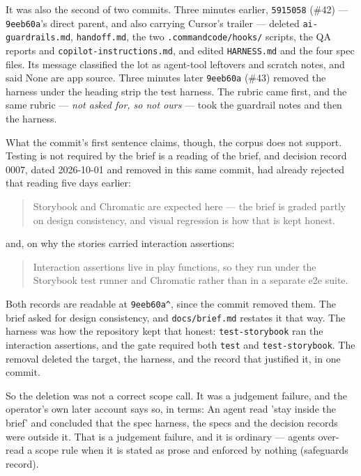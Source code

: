 \documentclass[11pt,a4paper]{article}
\begin{document}
It was also the second of two commits. Three minutes earlier, \texttt{5915058} (\#42) --- \texttt{9eeb60a}'s direct parent, and also carrying Cursor's trailer --- deleted \texttt{ai-guardrails.md}, \texttt{handoff.md}, the two \texttt{.commandcode/hooks/} scripts, the QA reports and \texttt{copilot-instructions.md}, and edited \texttt{HARNESS.md} and the four spec files. Its message classified the lot as \textquotedbl{}agent-tool leftovers and scratch notes\textquotedbl{}, and said \textquotedbl{}None are app source\textquotedbl{}. Three minutes later \texttt{9eeb60a} (\#43) removed the harness under the heading \textquotedbl{}strip the test harness\textquotedbl{}. The rubric came first, and the same rubric --- \emph{not asked for, so not ours} --- took the guardrail notes and then the harness.

What the commit's first sentence claims, though, the corpus does not support. \textquotedbl{}Testing is not required by the brief\textquotedbl{} is a reading of the brief, and decision record 0007, dated 2026-10-01 and removed in this same commit, had already rejected that reading five days earlier:

\begin{quote}
Storybook and Chromatic are expected here --- the brief is graded partly on design consistency, and visual regression is how that is kept honest.
\end{quote}

and, on why the stories carried interaction assertions:

\begin{quote}
Interaction assertions live in play functions, so they run under the Storybook test runner and Chromatic rather than in a separate e2e suite.
\end{quote}

Both records are readable at \texttt{9eeb60a\textasciicircum{}}, since the commit removed them. The brief asked for design consistency, and \texttt{docs/brief.md} restates it that way. The harness was how the repository kept that honest: \texttt{test-storybook} ran the interaction assertions, and the gate required both \texttt{test} and \texttt{test-storybook}. The removal deleted the target, the harness, and the record that justified it, in one commit.

So the deletion was not a correct scope call. It was a judgement failure, and the operator's own later account says so, in terms: \textquotedbl{}An agent read 'stay inside the brief' and concluded that the spec harness, the specs and the decision records were outside it. That is a judgement failure, and it is ordinary --- agents over-read a scope rule when it is stated as prose and enforced by nothing\textquotedbl{} (safeguards record).
\end{document}
